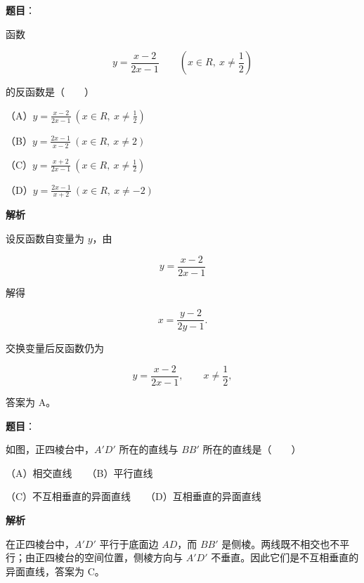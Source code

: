 \begin{answer}

\textbf{题目}：

函数

\nopagebreak[4]
\[
y=\frac{x-2}{2x-1}\qquad\left(x\in R,\ x\ne\frac12\right)
\]

的反函数是\mbox{（　　）}

（A）$y=\frac{x-2}{2x-1}\ (x\in R,\ x\ne\frac12)$

（B）$y=\frac{2x-1}{x-2}\ (x\in R,\ x\ne2)$

（C）$y=\frac{x+2}{2x-1}\ (x\in R,\ x\ne\frac12)$

（D）$y=\frac{2x-1}{x+2}\ (x\in R,\ x\ne-2)$

\textbf{解析}

设反函数自变量为 $y$，由

\nopagebreak[4]
\[
y=\frac{x-2}{2x-1}
\]

解得

\nopagebreak[4]
\[
x=\frac{y-2}{2y-1}.
\]

交换变量后反函数仍为

\nopagebreak[4]
\[
y=\frac{x-2}{2x-1},\qquad x\ne\frac12,
\]

答案为 A。


\end{answer}
\begin{answer}

\textbf{题目}：

如图，正四棱台中，$A'D'$ 所在的直线与 $BB'$ 所在的直线是\mbox{（　　）}
\nopagebreak[4]
\begin{center}\end{center}
\nopagebreak[4]
（A）相交直线　　（B）平行直线

（C）不互相垂直的异面直线　　（D）互相垂直的异面直线

\textbf{解析}

在正四棱台中，$A'D'$ 平行于底面边 $AD$，而 $BB'$ 是侧棱。两线既不相交也不平行；由正四棱台的空间位置，侧棱方向与 $A'D'$ 不垂直。因此它们是不互相垂直的异面直线，答案为 C。


\end{answer}
